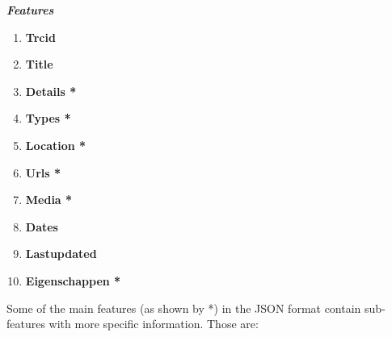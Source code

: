 \documentclass[runningheads,a4paper]{../../StyleFiles/llncs}
\begin{document}
\begin{center}
	\textbf{\emph{Features}}
\begin{multicols}{2}
	\begin{enumerate}
		\item \textbf{Trcid}
		\item \textbf{Title}
		\item \textbf{Details *}
		\item \textbf{Types *}
		\item \textbf{Location *}
		\item \textbf{Urls *}
		\item \textbf{Media *}
		\item \textbf{Dates}
		\item \textbf{Lastupdated}
		\item \textbf{Eigenschappen *} 
		\end{enumerate}
\end{multicols}
\end{center} 

Some of the main features (as shown by *) in the JSON format contain sub-features with more specific information. Those are:
\end{document}
